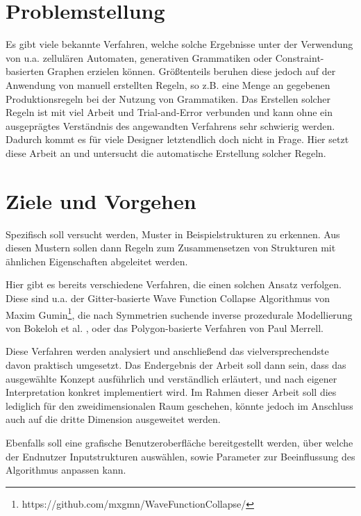 \section{Problemstellung}
Es gibt viele bekannte Verfahren, welche solche Ergebnisse unter der Verwendung von u.a. zellulären Automaten, generativen
Grammatiken oder Constraint-basierten Graphen erzielen können. \cite{5_van_der_linden_et_al} Größtenteils beruhen diese jedoch auf der Anwendung
von manuell erstellten Regeln, so z.B. eine Menge an gegebenen Produktionsregeln bei der Nutzung von Grammatiken. Das Erstellen
solcher Regeln ist mit viel Arbeit und Trial-and-Error verbunden und kann ohne ein ausgeprägtes Verständnis des angewandten Verfahrens
sehr schwierig werden. Dadurch kommt es für viele Designer letztendlich doch nicht in Frage. Hier setzt diese Arbeit an und untersucht
die automatische Erstellung solcher Regeln.

\section{Ziele und Vorgehen}
Spezifisch soll versucht werden, Muster in Beispielstrukturen zu erkennen. Aus diesen Mustern sollen dann Regeln zum Zusammensetzen
von Strukturen mit ähnlichen Eigenschaften abgeleitet werden.

Hier gibt es bereits verschiedene Verfahren, die einen solchen Ansatz verfolgen. Diese sind u.a. der Gitter-basierte Wave Function
Collapse Algorithmus von Maxim Gumin\footnote{https://github.com/mxgmn/WaveFunctionCollapse/}, die nach Symmetrien suchende inverse
prozedurale Modellierung von Bokeloh et al. \cite{3_bokeloh_et_al}, oder das Polygon-basierte Verfahren von Paul Merrell.\cite{1_merrell}

Diese Verfahren werden analysiert und anschließend das vielversprechendste davon praktisch umgesetzt. Das Endergebnis der Arbeit
soll dann sein, dass das ausgewählte Konzept ausführlich und verständlich erläutert, und nach eigener Interpretation konkret
implementiert wird. Im Rahmen dieser Arbeit soll dies lediglich für den zweidimensionalen Raum geschehen, könnte jedoch im Anschluss
auch auf die dritte Dimension ausgeweitet werden.

Ebenfalls soll eine grafische Benutzeroberfläche bereitgestellt werden, über welche der Endnutzer Inputstrukturen auswählen, sowie
Parameter zur Beeinflussung des Algorithmus anpassen kann.